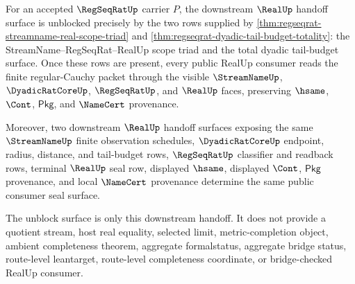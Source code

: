 \begin{theorem}
\label{thm:regseqrat-consumer-seal-unblock-surface}
For an accepted $\RegSeqRatUp$ carrier $P$, the downstream $\RealUp$ handoff
surface is unblocked precisely by the two rows supplied by
\autoref{thm:regseqrat-streamname-real-scope-triad} and
\autoref{thm:regseqrat-dyadic-tail-budget-totality}: the StreamName--RegSeqRat--RealUp
scope triad and the total dyadic tail-budget surface. Once these rows are
present, every public RealUp consumer reads the finite regular-Cauchy packet
through the visible $\StreamNameUp$, $\DyadicRatCoreUp$, $\RegSeqRatUp$, and
$\RealUp$ faces, preserving $\hsame$, $\Cont$, $\mathsf{Pkg}$, and
$\NameCert$ provenance.

Moreover, two downstream $\RealUp$ handoff surfaces exposing the same
$\StreamNameUp$ finite observation schedules, $\DyadicRatCoreUp$ endpoint,
radius, distance, and tail-budget rows, $\RegSeqRatUp$ classifier and readback
rows, terminal $\RealUp$ seal row, displayed $\hsame$, displayed $\Cont$,
$\mathsf{Pkg}$ provenance, and local $\NameCert$ provenance determine the same
public consumer seal surface.

The unblock surface is only this downstream handoff. It does not provide a
quotient stream, host real equality, selected limit, metric-completion object,
ambient completeness theorem, aggregate formalstatus, aggregate bridge status,
route-level leantarget, route-level completeness coordinate, or bridge-checked
RealUp consumer.
\end{theorem}
